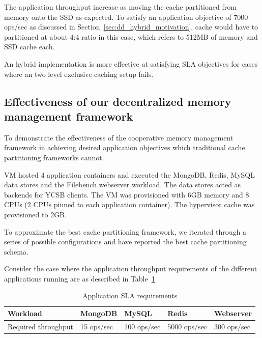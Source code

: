 	The application throughput increase as moving the cache partitioned from memory onto the SSD as expected.
	To satisfy an application objective of 7000 ops/sec as discussed in Section~\ref{sec:dd_hybrid_motivation}, 
	cache would have to partitioned at about 4:4 ratio in this case, which refers to 512MB of memory and SSD 
	cache each.
	
	An hybrid implementation is more effective at satisfying SLA objectives for cases where an two level exclusive
	caching setup fails.
	
    \subsection{Effectiveness of our decentralized memory management framework}
      
	To demonstrate the effectiveness of the cooperative memory management framework in achieving desired application 
	objectives which traditional cache partitioning frameworks cannot.
	
	VM hosted 4 application containers and executed the MongoDB, Redis, MySQL data stores and
	the Filebench webserver workload. The data stores acted as backends for YCSB clients. The VM 
	was provisioned with 6GB memory and 8 CPUs (2 CPUs pinned to each application container). 
	The hypervisor cache was provisioned to 2GB.
	
	To approximate the best cache partitioning framework, we iterated through a series of possible 
	configurations and have reported the best cache partitioning schema. 
	
	Consider the case where the application throughput requirements of the different applications running
	are as described in Table~\ref{table:desired_app_throughputs}
	
	    \begin{table}
		\begin{center}
		  \begin{tabular}{ l | l | l | l | l }	      	    
			Workload & MongoDB & MySQL & Redis & Webserver \\ 
		    \hline
			Required throughput & 15 ops/sec & 100 ops/sec & 5000 ops/sec & 300 ops/sec \\		   
		  \end{tabular}
		\caption{Application SLA requirements}
		\label{table:desired_app_throughputs}
		\end{center}	  
	      \end{table}
	  
